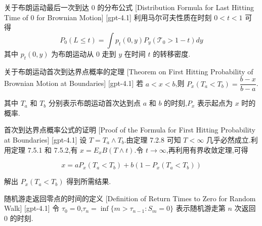 \documentclass[UTF8]{ctexart}
\begin{document}
    
    
    \begin{thm}
        {关于布朗运动最后一次到达 0 的分布公式}
        [Distribution Formula for Last Hitting Time of 0 for Brownian Motion]
        [gpt-4.1]
        利用马尔可夫性质在时刻 $0 < t < 1$ 可得
\[
P_0(L \leq t) = \int p_t(0, y) P_y(\mathcal{T}_0 > 1 - t) dy
\]
其中 $p_t(0, y)$ 为布朗运动从 0 走到 $y$ 在时间 $t$ 的转移密度.
    \end{thm}
    
    
    
    \begin{thm}
        {关于布朗运动首次到达界点概率的定理}
        [Theorem on First Hitting Probability of Brownian Motion at Boundaries]
        [gpt-4.1]
        若 $a < x < b$,则 $P_{x}(T_{a} < T_{b}) = \dfrac{b-x}{b-a}$.

其中 $T_a$ 和 $T_b$ 分别表示布朗运动首次达到点 $a$ 和 $b$ 的时刻,$P_x$ 表示起点为 $x$ 时的概率.

    \end{thm}
    
    
    
    \begin{prf}
        {首次到达界点概率公式的证明}
        [Proof of the Formula for First Hitting Probability at Boundaries]
        [gpt-4.1]
        设 $T = T_{a} \land T_{b}$.由定理 7.2.8 可知 $T < \infty$ 几乎必然成立.利用定理 7.5.1 和 7.5.2,有 $x = E_{x} B(T \wedge t)$.令 $t \to \infty$,再利用有界收敛定理,可得

\[
x = a P_{x}(T_{a} < T_{b}) + b (1 - P_{x}(T_{a} < T_{b}))
\]

解出 $P_{x}(T_{a} < T_{b})$ 得到所需结果.

    \end{prf}
    
    
    
    \begin{dfn}
        {随机游走返回零点的时间的定义}
        [Definition of Return Times to Zero for Random Walk]
        [gpt-4.1]
        令 $\tau_0 = 0$,$\tau_n = \inf\{ m > \tau_{n-1} : S_m = 0 \}$ 表示随机游走第 $n$ 次返回 0 的时刻.
    \end{dfn}
    
    
    
\end{document}
